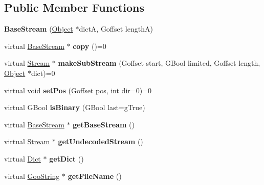 \subsection*{Public Member Functions}
\begin{DoxyCompactItemize}
\item 
\mbox{\label{class_base_stream_a6cf361381d246846eac44d649a630b09}} 
{\bfseries Base\+Stream} (\hyperlink{class_object}{Object} $\ast$dictA, Goffset lengthA)
\item 
\mbox{\label{class_base_stream_a1e486654d0bc40e4e2834e8498213cd6}} 
virtual \hyperlink{class_base_stream}{Base\+Stream} $\ast$ {\bfseries copy} ()=0
\item 
\mbox{\label{class_base_stream_a38fd4aa8d528d2132380401dd3ff4c2e}} 
virtual \hyperlink{class_stream}{Stream} $\ast$ {\bfseries make\+Sub\+Stream} (Goffset start, G\+Bool limited, Goffset length, \hyperlink{class_object}{Object} $\ast$dict)=0
\item 
\mbox{\label{class_base_stream_acd433a2780d814a3bc1947e2bf75dd5e}} 
virtual void {\bfseries set\+Pos} (Goffset pos, int dir=0)=0
\item 
\mbox{\label{class_base_stream_a8d4b5d32270889010e6dcba2e0791e8c}} 
virtual G\+Bool {\bfseries is\+Binary} (G\+Bool last=g\+True)
\item 
\mbox{\label{class_base_stream_a10ee62b35abb0236d33e97e46f531906}} 
virtual \hyperlink{class_base_stream}{Base\+Stream} $\ast$ {\bfseries get\+Base\+Stream} ()
\item 
\mbox{\label{class_base_stream_a7e7da81db581bacdc9d078a8a6d1aeb2}} 
virtual \hyperlink{class_stream}{Stream} $\ast$ {\bfseries get\+Undecoded\+Stream} ()
\item 
\mbox{\label{class_base_stream_ad6812d4617c0b8dc274a94a42cb440f0}} 
virtual \hyperlink{class_dict}{Dict} $\ast$ {\bfseries get\+Dict} ()
\item 
\mbox{\label{class_base_stream_a436486387c8fda3bf0f65d71c05897cb}} 
virtual \hyperlink{class_goo_string}{Goo\+String} $\ast$ {\bfseries get\+File\+Name} ()

\end{DoxyCompactItemize}
